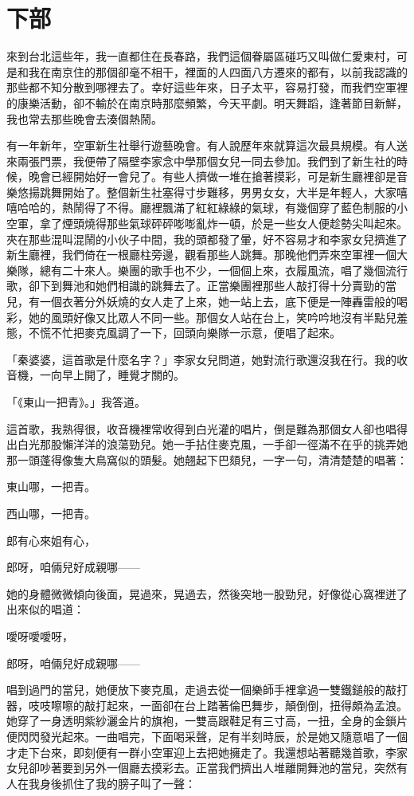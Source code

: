 
\section{下部}

\sloppy

來到台北這些年，我一直都住在長春路，我們這個眷屬區碰巧又叫做仁愛東村，可是和我在南京住的那個卻毫不相干，裡面的人四面八方遷來的都有，以前我認識的那些都不知分散到哪裡去了。幸好這些年來，日子太平，容易打發，而我們空軍裡的康樂活動，卻不輸於在南京時那麼頻繁，今天平劇。明天舞蹈，逢著節目新鮮，我也常去那些晚會去湊個熱鬧。

有一年新年，空軍新生社舉行遊藝晚會。有人說歷年來就算這次最具規模。有人送來兩張門票，我便帶了隔壁李家念中學那個女兒一同去參加。我們到了新生社的時候，晚會已經開始好一會兒了。有些人擠做一堆在搶著摸彩，可是新生廳裡卻是音樂悠揚跳舞開始了。整個新生社塞得寸步難移，男男女女，大半是年輕人，大家嘻嘻哈哈的，熱鬧得了不得。廳裡飄滿了紅紅綠綠的氣球，有幾個穿了藍色制服的小空軍，拿了煙頭燒得那些氣球砰砰嘭嘭亂炸一頓，於是一些女人便趁勢尖叫起來。夾在那些混叫混鬧的小伙子中間，我的頭都發了暈，好不容易才和李家女兒擠進了新生廳裡，我們倚在一根廳柱旁邊，觀看那些人跳舞。那晚他們弄來空軍裡一個大樂隊，總有二十來人。樂團的歌手也不少，一個個上來，衣履風流，唱了幾個流行歌，卻下到舞池和她們相識的跳舞去了。正當樂團裡那些人敲打得十分賣勁的當兒，有一個衣著分外妖燒的女人走了上來，她一站上去，底下便是一陣轟雷般的喝彩，她的風頭好像又比眾人不同一些。那個女人站在台上，笑吟吟地沒有半點兒羞態，不慌不忙把麥克風調了一下，回頭向樂隊一示意，便唱了起來。

「秦婆婆，這首歌是什麼名字？」李家女兒問道，她對流行歌還沒我在行。我的收音機，一向早上開了，睡覺才關的。

「《東山一把青》。」我答道。

這首歌，我熟得很，收音機裡常收得到白光灌的唱片，倒是難為那個女人卻也唱得出白光那股懶洋洋的浪蕩勁兒。她一手拈住麥克風，一手卻一徑滿不在乎的挑弄她那一頭蓬得像隻大鳥窩似的頭髮。她翹起下巴頦兒，一字一句，清清楚楚的唱著：

東山哪，一把青。

西山哪，一把青。

郎有心來姐有心，

郎呀，咱倆兒好成親哪——

她的身體微微傾向後面，晃過來，晃過去，然後突地一股勁兒，好像從心窩裡迸了出來似的唱道：

噯呀噯噯呀，

郎呀，咱倆兒好成親哪——

唱到過門的當兒，她便放下麥克風，走過去從一個樂師手裡拿過一雙鐵鎚般的敲打器，吱吱嚓嚓的敲打起來，一面卻在台上踏著倫巴舞步，顛倒倒，扭得頗為孟浪。她穿了一身透明紫紗灑金片的旗袍，一雙高跟鞋足有三寸高，一扭，全身的金鎖片便閃閃發光起來。一曲唱完，下面喝采聲，足有半刻時辰，於是她又隨意唱了一個才走下台來，即刻便有一群小空軍迎上去把她擁走了。我還想站著聽幾首歌，李家女兒卻吵著要到另外一個廳去摸彩去。正當我們擠出人堆離開舞池的當兒，突然有人在我身後抓住了我的膀子叫了一聲：

